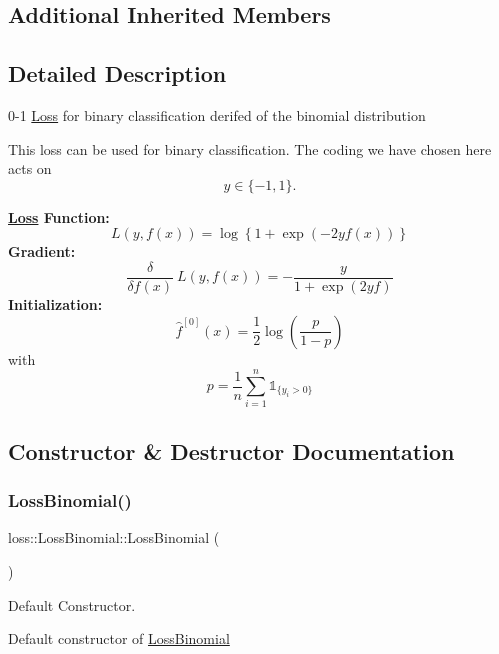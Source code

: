 \subsection*{Additional Inherited Members}


\subsection{Detailed Description}
0-\/1 \mbox{\hyperlink{classloss_1_1_loss}{Loss}} for binary classification derifed of the binomial distribution 

This loss can be used for binary classification. The coding we have chosen here acts on \[ y \in \{-1, 1\}. \]

{\bfseries \mbox{\hyperlink{classloss_1_1_loss}{Loss}} Function\+:} \[ L(y, f(x)) = \log\left\{1 + \exp\left(-2yf(x)\right)\right\} \] {\bfseries Gradient\+:} \[ \frac{\delta}{\delta f(x)}\ L(y, f(x)) = - \frac{y}{1 + \exp\left(2yf\right)} \] {\bfseries Initialization\+:} \[ \hat{f}^{[0]}(x) = \frac{1}{2}\log\left(\frac{p}{1 - p}\right) \] with \[ p = \frac{1}{n}\sum\limits_{i=1}^n\mathbb{1}_{\{y_i > 0\}} \] 

\subsection{Constructor \& Destructor Documentation}
\mbox{\label{classloss_1_1_loss_binomial_ab1d025ad170fc10db1469cccaf8d877d}} 
\subsubsection{\texorpdfstring{Loss\+Binomial()}{LossBinomial()}\hspace{0.1cm}{\footnotesize\ttfamily [1/2]}}
{\footnotesize\ttfamily loss\+::\+Loss\+Binomial\+::\+Loss\+Binomial (\begin{DoxyParamCaption}{ }\end{DoxyParamCaption})}



Default Constructor. 

Default constructor of {\ttfamily \mbox{\hyperlink{classloss_1_1_loss_binomial}{Loss\+Binomial}}} \mbox{\label{classloss_1_1_loss_binomial_a16c4400af5c790a56ac0e0fcb7d1c5c5}} 
